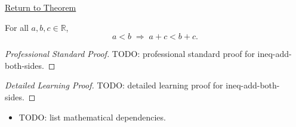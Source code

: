 \newpage
{}
\label{prf:ineq-add-both-sides}

\begin{remark*}[Return]
\hyperref[thm:ineq-add-both-sides]{Return to Theorem}
\end{remark*}

\begin{theorem*}
For all $a, b, c \in \mathbb{R}$,
\[
  a < b \;\Rightarrow\; a + c < b + c.
\]
\end{theorem*}

\begin{proof}[Professional Standard Proof]
\LRAProofBodyStart
TODO: professional standard proof for ineq-add-both-sides.
\end{proof}

\begin{proof}[Detailed Learning Proof]
\LRAProofBodyStart
TODO: detailed learning proof for ineq-add-both-sides.
\end{proof}

\begin{remark*}
\end{remark*}

\begin{dependencies}
\begin{itemize}
  \item TODO: list mathematical dependencies.
\end{itemize}
\end{dependencies}

\clearpage
